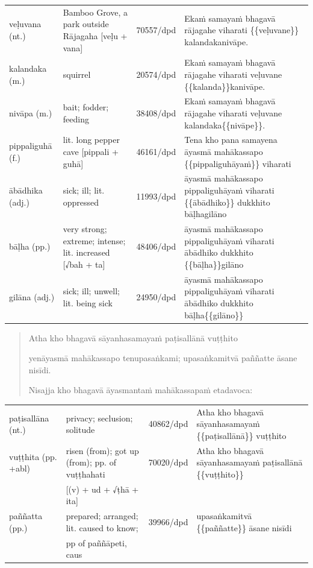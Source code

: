 \documentclass[11pt,oneside]{memoir}
\begin{document}
\begin{longtable}{L{\colOne} L{\colTwo} H H}
veḷuvana (nt.) & Bamboo Grove, a park outside Rājagaha [veḷu + vana] & 70557/dpd & Ekaṁ samayaṁ bhagavā rājagahe viharati \{\{veḷuvane\}\} kalandakanivāpe.\\[0pt]
kalandaka (m.) & squirrel & 20574/dpd & Ekaṁ samayaṁ bhagavā rājagahe viharati veḷuvane \{\{kalanda\}\}kanivāpe.\\[0pt]
nivāpa (m.) & bait; fodder; feeding & 38408/dpd & Ekaṁ samayaṁ bhagavā rājagahe viharati veḷuvane kalandaka\{\{nivāpe\}\}.\\[0pt]
pippaliguhā (f.) & lit. long pepper cave [pippali + guhā] & 46161/dpd & Tena kho pana samayena āyasmā mahākassapo \{\{pippaliguhāyaṁ\}\} viharati\\[0pt]
ābādhika (adj.) & sick; ill; lit. oppressed & 11993/dpd & āyasmā mahākassapo pippaliguhāyaṁ viharati \{\{ābādhiko\}\} dukkhito bāḷhagilāno\\[0pt]
bāḷha (pp.) & very strong; extreme; intense; lit. increased [√bah + ta] & 48406/dpd & āyasmā mahākassapo pippaliguhāyaṁ viharati ābādhiko dukkhito \{\{bāḷha\}\}gilāno\\[0pt]
gilāna (adj.) & sick; ill; unwell; lit. being sick & 24950/dpd & āyasmā mahākassapo pippaliguhāyaṁ viharati ābādhiko dukkhito bāḷha\{\{gilāno\}\}\\[0pt]
\end{longtable}

\clearpage
\casesLegendHeaderBGHere

\begin{quote}
Atha kho bhagavā sāyanhasamayaṁ paṭisallānā vuṭṭhito

yenāyasmā mahākassapo tenupasaṅkami; upasaṅkamitvā paññatte āsane nisīdi.

Nisajja kho bhagavā āyasmantaṁ mahākassapaṁ etadavoca:
\end{quote}

\begin{longtable}{L{\colOne} L{\colTwo} H H}
paṭisallāna (nt.) & privacy; seclusion; solitude & 40862/dpd & Atha kho bhagavā sāyanhasamayaṁ \{\{paṭisallānā\}\} vuṭṭhito\\[0pt]
vuṭṭhita (pp. +abl) & risen (from); got up (from); pp. of vuṭṭhahati & 70020/dpd & Atha kho bhagavā sāyanhasamayaṁ paṭisallānā \{\{vuṭṭhito\}\}\\[0pt]
 & [(v) + ud + √ṭhā + ita] &  & \\[0pt]
paññatta (pp.) & prepared; arranged; lit. caused to know; & 39966/dpd & upasaṅkamitvā \{\{paññatte\}\} āsane nisīdi\\[0pt]
 & pp of paññāpeti, caus &  & \\[0pt]
\end{longtable}
\end{document}
